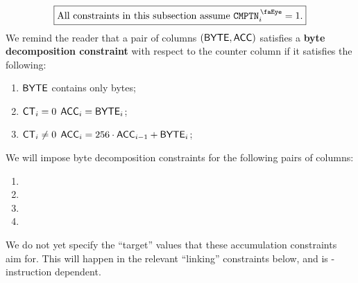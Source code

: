 \[
    \boxed{\text{All constraints in this subsection assume } \isComputation _{i} = 1.}
\]
We remind the reader that a pair of columns $(\textsf{BYTE}, \textsf{ACC})$ satisfies a
\textbf{byte decomposition constraint} with respect to the counter column \ct{} if it satisfies the following:
\begin{enumerate}
    \item $\textsf{BYTE}$ contains only bytes;
    \item \If $\textsf{CT}_{i} = 0$    \Then $\textsf{ACC}_{i} = \textsf{BYTE}_{i}$;
    \item \If $\textsf{CT}_{i} \neq 0$ \Then $\textsf{ACC}_{i} = 256 \cdot \textsf{ACC}_{i - 1} + \textsf{BYTE}_{i}$;
\end{enumerate}
We will impose byte decomposition constraints for the following pairs of columns:
\begin{multicols}{2}
       \begin{enumerate}
           \item \compRawByte
           \item \compRawAcc
           \item \compTrimByte
           \item \compTrimAcc
       \end{enumerate} 
\end{multicols}
\saNote{} We do not yet specify the ``target'' values that these accumulation constraints aim for.
This will happen in the relevant ``linking'' constraints below, and is \expMod{}-instruction dependent.
